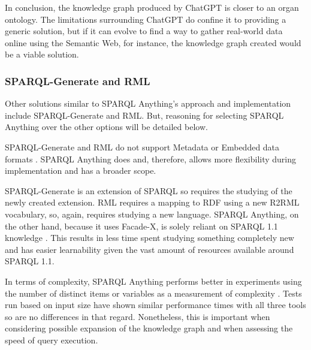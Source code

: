 In conclusion, the knowledge graph produced by ChatGPT is closer to an organ ontology. The limitations surrounding ChatGPT do confine it to providing a generic solution, but if it can evolve to find a way to gather real-world data online using the Semantic Web, for instance, the knowledge graph created would be a viable solution.

\subsubsection{SPARQL-Generate and RML}
\hspace{0.5cm} Other solutions similar to SPARQL Anything's approach and implementation include SPARQL-Generate and RML. But, reasoning for selecting SPARQL Anything over the other options will be detailed below.

SPARQL-Generate and RML do not support Metadata or Embedded data formats \cite{sparqlanything}. SPARQL Anything does and, therefore, allows more flexibility during implementation and has a broader scope. 

SPARQL-Generate is an extension of SPARQL so requires the studying of the newly created extension. RML requires a mapping to RDF using a new R2RML vocabulary, so, again, requires studying a new language. SPARQL Anything, on the other hand, because it uses Facade-X, is solely reliant on SPARQL 1.1 knowledge \cite{sparqlanything}. This results in less time spent studying something completely new and has easier learnability given the vast amount of resources available around SPARQL 1.1.

In terms of complexity, SPARQL Anything performs better in experiments using the number of distinct items or variables as a measurement of complexity \cite{sparqlanything}. Tests run based on input size have shown similar performance times with all three tools so are no differences in that regard. Nonetheless, this is important when considering possible expansion of the knowledge graph and when assessing the speed of query execution. 

